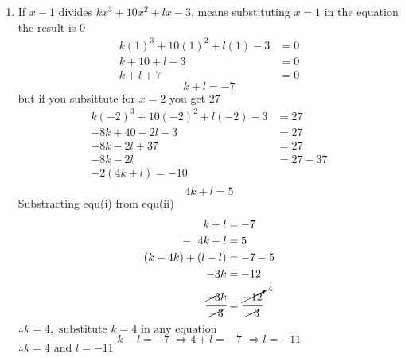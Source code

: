 \begin{multicols}{2}
\begin{enumerate}[label={\textbf{\arabic*.}}]
    \item If $x-1$ divides $kx^3+10x^2+lx-3$, means substituting $x=1$ in the equation the result is $0$ 
    \begin{align*}
        k(1)^3+10(1)^2+l(1)-3 &= 0 \\
        k + 10 + l - 3 &= 0 \\
        k + l + 7 &= 0 
    \end{align*} 
    \begin{equation}\tag{i}
        k + l = -7
    \end{equation} \vspace{-5pt}
    but if you subsittute for $x = 2$ you get $27$ \\ \vspace{-10pt}
    \begin{align*}
        k(-2)^3 + 10(-2)^2 + l(-2) - 3 &= 27 \\
        -8k + 40 -2l -3 &= 27 \\
        -8k - 2l + 37 &= 27 \\
        -8k -2l &= 27 - 37 \\
        -2(4k + l) = -10 \\
    \end{align*}
    \begin{equation}\tag{ii} 
        4k + l = 5
    \end{equation}
    Substracting equ(i) from equ(ii)
    \begin{align*} 
        k + l &= -7 \\
       -\hspace{6pt} 4k + l  &= 5 \\
       (k - 4k ) + (l - l) & = -7 - 5  \\
       -3k & = -12 \\
       \cfrac{\cancel{-3}k}{\cancel{-3}} & = \cfrac{\cancelto{4}{-12}}{\cancel{-3}}
    \end{align*} 
    $\therefore k = 4, \text{ substitute } k = 4 \text{ in any equation }$ 
       $$ k+l = -7 \,\, \Rightarrow 4 + l = -7 \,\, \Rightarrow l = -11$$
    $\therefore k = 4 \text{ and } l = -11$


\end{enumerate}
\end{multicols}
